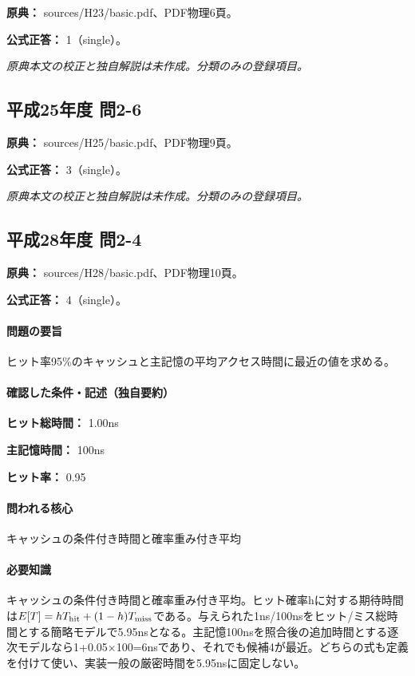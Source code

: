 \noindent\textbf{原典：} sources/H23/basic.pdf、PDF物理6頁。

\textbf{公式正答：} 1（single）。

\par\textit{原典本文の校正と独自解説は未作成。分類のみの登録項目。}

\subsection{平成25年度 問2-6}
\label{q:h25-reg-basic-2-6}

\noindent\textbf{原典：} sources/H25/basic.pdf、PDF物理9頁。

\textbf{公式正答：} 3（single）。

\par\textit{原典本文の校正と独自解説は未作成。分類のみの登録項目。}

\subsection{平成28年度 問2-4}
\label{q:h28-reg-basic-2-4}

\noindent\textbf{原典：} sources/H28/basic.pdf、PDF物理10頁。

\textbf{公式正答：} 4（single）。

\paragraph{問題の要旨} ヒット率95\%のキャッシュと主記憶の平均アクセス時間に最近の値を求める。

\paragraph{確認した条件・記述（独自要約）}\mbox{}\par

\noindent\textbf{ヒット総時間：} 1.00ns\par

\noindent\textbf{主記憶時間：} 100ns\par

\noindent\textbf{ヒット率：} 0.95\par

\paragraph{問われる核心} キャッシュの条件付き時間と確率重み付き平均

\paragraph{必要知識} キャッシュの条件付き時間と確率重み付き平均。ヒット確率hに対する期待時間は\(E[T]=hT_{\rm hit}+(1-h)T_{\rm miss}\)である。与えられた1ns/100nsをヒット/ミス総時間とする簡略モデルで5.95nsとなる。主記憶100nsを照合後の追加時間とする逐次モデルなら1+0.05×100=\allowbreak{}6nsであり、それでも候補4が最近。どちらの式も定義を付けて使い、実装一般の厳密時間を5.95nsに固定しない。

